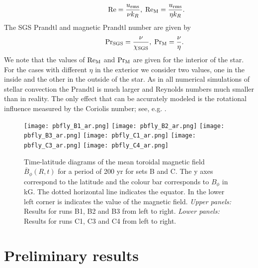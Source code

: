 \documentclass[baaa]{baaa}
\begin{document}
\begin{equation}
   \;\;\;\;\;\;\;\;\;\;\;\;\;\;\;\;\;\;{\rm Re} = \frac{u_{\rm rms}}{\nu k_{R}}, \; {\rm Re_{\rm M}} = \frac{u_{\rm rms}}{\eta k_{R}}.
\end{equation}
The SGS Prandtl and magnetic Prandtl number are given by
\begin{equation}
    \;\;\;\;\;\;\;\;\;\;\;\;\;\;\;\;{\rm Pr_{SGS}} = \frac{\nu}{\chi_{\rm SGS}}, \; {\rm Pr_{\rm M}} = \frac{\nu}{\eta}.
\end{equation}
We note that the values of ${\rm Re_{\rm M}}$ and $\rm Pr_{\rm M}$ are given for the interior of the star. For the cases with different $\eta$ in the exterior we consider two values, one in the inside and the other in the outside of the star.
As in all numerical simulations of stellar convection the Prandtl is much larger and Reynolds numbers much smaller than in reality. The only effect that can be accurately modeled is the rotational influence measured by the Coriolis number; see, e.g. \cite{2023SSRv..219...58K}.


\begin{figure*}[t!]
    \centering
    \texttt{[image: pbfly\_B1\_ar.png]}
    \texttt{[image: pbfly\_B2\_ar.png]}
    \texttt{[image: pbfly\_B3\_ar.png]}
    \texttt{[image: pbfly\_C1\_ar.png]}
    \texttt{[image: pbfly\_C3\_ar.png]}
    \texttt{[image: pbfly\_C4\_ar.png]}
    \caption{Time-latitude diagrams of the mean toroidal magnetic field $\overline{B}_{\phi}(R, t)$ for a period of 200 yr for sets B and C. The y axes correspond to the latitude and the colour bar corresponds to $B_{\phi}$ in kG. The dotted horizontal line indicates the equator. In the lower left corner is indicates the value of the magnetic field. \emph{Upper panels:} Results for runs B1, B2 and B3 from left to right. \emph{Lower panels:} Results for runs C1, C3 and C4 from left to right.}
    \label{pbfly}
\end{figure*}


\section{Preliminary results}\label{S_results}
\end{document}
